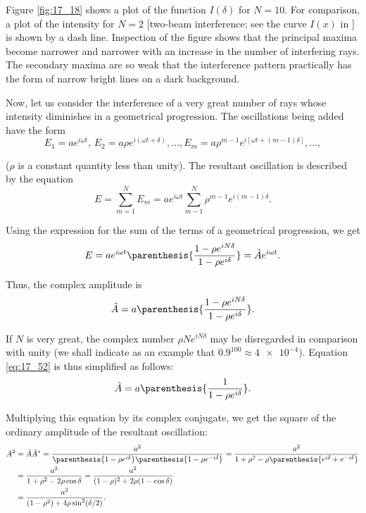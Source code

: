 Figure \ref{fig:17_18} shows a plot of the function $I(\delta)$ for $N=10$.
For comparison, a plot of the intensity for $N=2$ [two-beam interference; see the curve $I(x)$ in ] is shown by a dash line.
Inspection of the figure shows that the principal maxima become narrower and narrower with an increase in the number of interfering rays.
The secondary maxima are so weak that the interference pattern practically has the form of narrow bright lines on a dark background.

Now, let us consider the interference of a very great number of rays whose intensity diminishes in a geometrical progression.
The oscillations being added have the form
\begin{equation}\label{eq:17_51}
    E_1 = a e^{i\omega t},\, E_2 = a \rho e^{i(\omega t+\delta)},\ldots, E_m = a \rho^{m-1} e^{i[\omega t+(m-1)\delta]}, \ldots,
\end{equation}

\noindent
($\rho$ is a constant quantity less than unity).
The resultant oscillation is described by the equation
\begin{equation*}
    E = \sum_{m=1}^N E_m = a e^{i\omega t} \sum_{m-1}^N \rho^{m-1} e^{i(m-1)\delta}.
\end{equation*}

\noindent
Using the expression for the sum of the terms of a geometrical progression, we get
\begin{equation*}
    E = a e^{i\omega t} \parenthesis{ \frac{1 - \rho e^{iN\delta}}{1 - \rho e^{i\delta}} } = \hat{A} e^{i\omega t}.
\end{equation*}

\noindent
Thus, the complex amplitude is
\begin{equation}\label{eq:17_52}
    \hat{A} = a \parenthesis{ \frac{1 - \rho e^{iN\delta}}{1 - \rho e^{i\delta}} }.
\end{equation}

If $N$ is very great, the complex number $\rho Ne^{iN\delta}$ may be disregarded in comparison with unity (we shall indicate as an example that $0.9^{100}\approx\num{4e-4}$).
Equation \eqref{eq:17_52} is thus simplified as follows:
\begin{equation*}
    \hat{A} = a \parenthesis{ \frac{1}{1 - \rho e^{i\delta}} }.
\end{equation*}

\noindent
Multiplying this equation by its complex conjugate, we get the square of the ordinary amplitude of the resultant oscillation:
\begin{align*}
    A^2 &= \hat{A}\hat{A}^* = \frac{a^2}{ \parenthesis{1 - \rho e^{i\delta}} \parenthesis{1 - \rho e^{-i\delta}} } = \frac{a^2}{ 1 + \rho^2 - \rho \parenthesis{e^{i\delta} + e^{-i\delta}} }\\
    &= \frac{a^2}{ 1 + \rho^2 - 2 \rho \cos\delta } = \frac{a^2}{ (1-\rho)^2 + 2\rho (1-\cos\delta) } \\
    &= \frac{a^2}{ (1-\rho^2) + 4\rho\sin^2(\delta/2) }.
\end{align*}

